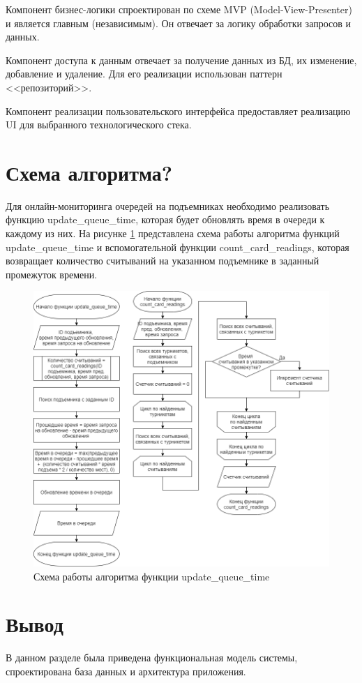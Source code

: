 Компонент бизнес-логики спроектирован по схеме MVP (Model-View-Presenter) и является главным (независимым). Он отвечает за логику обработки запросов и данных.

Компонент доступа к данным отвечает за получение данных из БД, их изменение, добавление и удаление. Для его реализации использован паттерн <<репозиторий>>. 

Компонент реализации пользовательского интерфейса предоставляет реализацию UI для выбранного технологического стека.

\section{Схема алгоритма?}\label{func_label}

Для онлайн-мониторинга очередей на подъемниках необходимо реализовать функцию update\_queue\_time, которая будет обновлять время в очереди к каждому из них. На рисунке \ref{img:function} представлена схема работы алгоритма функций update\_queue\_time и вспомогательной функции count\_card\_readings, которая возвращает количество считываний на указанном подъемнике в заданный промежуток времени.

\begin{figure}[h!]
	\begin{center}
		\includegraphics[scale=0.55]{../imgs/function.png}
	\end{center}
	\captionsetup{justification=centering}
	\caption{Схема работы алгоритма функции update\_queue\_time}
	\label{img:function}
\end{figure}


\section*{Вывод}

В данном разделе была приведена функциональная модель системы, спроектирована база данных и архитектура приложения.




